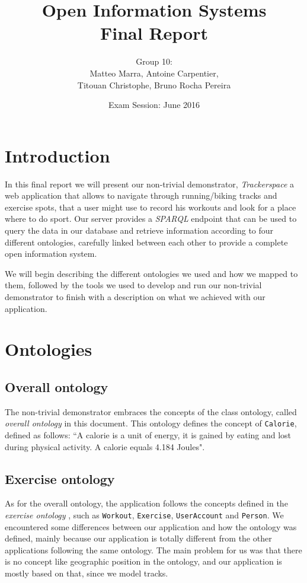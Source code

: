 \documentclass[11pt,a4paper]{article}
\author{Group 10: \\ Matteo Marra, Antoine Carpentier, \\Titouan Christophe, Bruno Rocha Pereira}
\title{Open Information Systems \\ Final Report}
\date{Exam Session: June 2016}
\begin{document}
\maketitle
\section{Introduction}
In this final report we will present our non-trivial demonstrator, \textit{Trackerspace} a web application that allows to navigate through running/biking tracks and exercise spots, that a user might use to record his workouts and look for a place where to do sport.
Our server provides a \textit{SPARQL} endpoint that can be used to query the data in our database and retrieve information according to four different ontologies, carefully linked between each other to provide a complete open information system.

We will begin describing the different ontologies we used and how we mapped to them, followed by the tools we used to develop and run our non-trivial demonstrator to finish with a description on what we achieved with our application.
\section{Ontologies}
\subsection{Overall ontology}
The non-trivial demonstrator embraces the concepts of the class ontology, called \textit{overall ontology} in this document.
This ontology defines the concept of \texttt{Calorie}, defined as follows: ``A calorie is a unit of energy, it is gained by eating and lost during physical activity. A calorie equals 4.184 Joules".

\subsection{Exercise ontology}
As for the overall ontology, the application follows the concepts defined in the \textit{exercise ontology} , such as \texttt{Workout}, \texttt{Exercise}, \texttt{UserAccount} and \texttt{Person}. 
We encountered some differences between our application and how the ontology was defined, mainly because our application is totally different from the other applications following the same ontology. The main problem for us was that there is no concept like geographic position in the ontology, and our application is mostly based on that, since we model tracks. 
\end{document}
